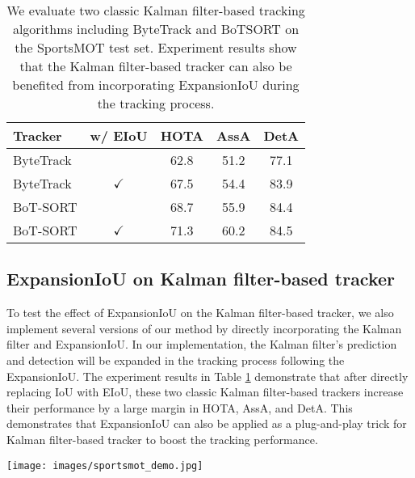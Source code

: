\documentclass[10pt,twocolumn,letterpaper]{article}
\begin{document}
\begin{table}[h]
\centering
\begin{tabular}{lcccc}
\hline
Tracker   & w/ EIoU & HOTA & AssA & DetA \\ \hline
ByteTrack &              & 62.8 & 51.2 & 77.1\\
ByteTrack & $\checkmark$ & 67.5 & 54.4 & 83.9\\
BoT-SORT   &              & 68.7 & 55.9 & 84.4\\
BoT-SORT   & $\checkmark$ & 71.3 & 60.2 & 84.5\\
\hline
\end{tabular}
\caption{We evaluate two classic Kalman filter-based tracking algorithms including ByteTrack \cite{ByteTrack} and BoTSORT \cite{aharon2022bot} on the SportsMOT test set. Experiment results show that the Kalman filter-based tracker can also be benefited from incorporating ExpansionIoU during the tracking process.}
\label{table:kf-eiou}
\end{table}


\subsection{ExpansionIoU on Kalman filter-based tracker}

To test the effect of ExpansionIoU on the Kalman filter-based tracker, we also implement several versions of our method by directly incorporating the Kalman filter and ExpansionIoU. In our implementation, the Kalman filter's prediction and detection will be expanded in the tracking process following the ExpansionIoU. The experiment results in Table \ref{table:kf-eiou} demonstrate that after directly replacing IoU with EIoU, these two classic Kalman filter-based trackers increase their performance by a large margin in HOTA, AssA, and DetA. This demonstrates that ExpansionIoU can also be applied as a plug-and-play trick for Kalman filter-based tracker to boost the tracking performance.

\begin{figure*}[t]
\texttt{[image: images/sportsmot\_demo.jpg]}
\centering
\caption{Visualization results of Deep-EIoU from random sampled clips of SportsMOT dataset (row 1 to 3) and SoccerNet-Tracking dataset (row 4 to 5). With the iterative scale-up ExpansionIoU and deep features association, our algorithm can achieve robust multi-athlete tracking under severe occlusion conditions in multiple diverse sports scenarios including basketball, football, and volleyball. More visualization results can be found in supplementary material.}
\end{figure*}
\end{document}
